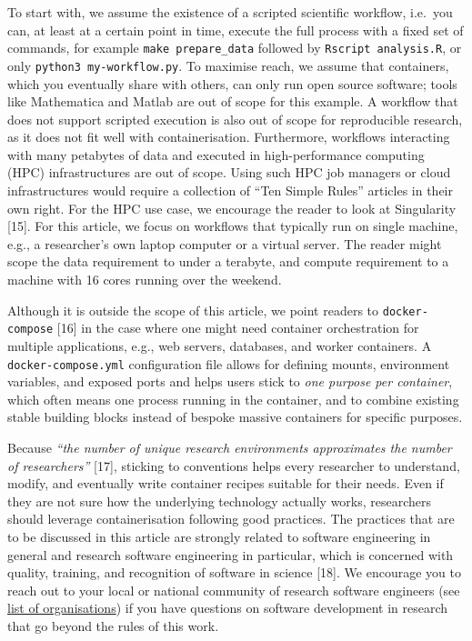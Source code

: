 \documentclass[10pt,letterpaper]{article}
\begin{document}
To start with, we assume the existence of a scripted scientific
workflow, i.e.~you can, at least at a certain point in time, execute the
full process with a fixed set of commands, for example
\texttt{make\ prepare\_data} followed by \texttt{Rscript\ analysis.R},
or only \texttt{python3\ my-workflow.py}. To maximise reach, we assume
that containers, which you eventually share with others, can only run
open source software; tools like Mathematica and Matlab are out of scope
for this example. A workflow that does not support scripted execution is
also out of scope for reproducible research, as it does not fit well
with containerisation. Furthermore, workflows interacting with many
petabytes of data and executed in high-performance computing (HPC)
infrastructures are out of scope. Using such HPC job managers or cloud
infrastructures would require a collection of ``Ten Simple Rules''
articles in their own right. For the HPC use case, we encourage the
reader to look at Singularity {[}15{]}. For this article, we focus on
workflows that typically run on single machine, e.g., a researcher's own
laptop computer or a virtual server. The reader might scope the data
requirement to under a terabyte, and compute requirement to a machine
with 16 cores running over the weekend.

Although it is outside the scope of this article, we point readers to
\texttt{docker-compose} {[}16{]} in the case where one might need
container orchestration for multiple applications, e.g., web servers,
databases, and worker containers. A \texttt{docker-compose.yml}
configuration file allows for defining mounts, environment variables,
and exposed ports and helps users stick to \emph{one purpose per
container}, which often means one process running in the container, and
to combine existing stable building blocks instead of bespoke massive
containers for specific purposes.

Because \emph{``the number of unique research environments approximates
the number of researchers''} {[}17{]}, sticking to conventions helps
every researcher to understand, modify, and eventually write container
recipes suitable for their needs. Even if they are not sure how the
underlying technology actually works, researchers should leverage
containerisation following good practices. The practices that are to be
discussed in this article are strongly related to software engineering
in general and research software engineering in particular, which is
concerned with quality, training, and recognition of software in science
{[}18{]}. We encourage you to reach out to your local or national
community of research software engineers (see
\href{https://en.wikipedia.org/wiki/Research_software_engineering}{list
of organisations}) if you have questions on software development in
research that go beyond the rules of this work.
\end{document}
